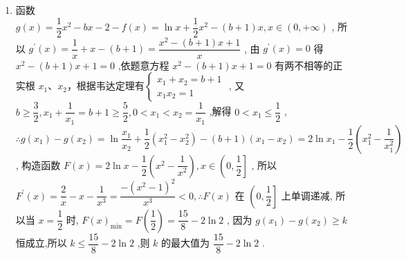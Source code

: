 \begin{enumerate}
\begin{enumerate}
\begin{jieda}
\begin{enumerate}
                $\therefore f\left( x\right)$ 在区间(0,1)上存在一个零点 ${x}_{3}$ ,此时 $k = 0$ ;
                又 $f\left( 3\right)  = 3 - \ln 3 - 2 = 1 - \ln 3 < 0$ , $f\left( 4\right)  = 4 - \ln 4 - 2 = 2 - 2\ln 2 = 2\left( {1 - \ln 2}\right)  > 0$ ,
                $\therefore f\left( x\right)$ 在区间(3,4)上存在一个零点 ${x}_{4}$ ,此时 $k = 3$ ,
                综上, $k$ 的值为 0 或 3 ;
                \item 函数 $g\left( x\right)  = \dfrac{1}{2}{x}^{2} - {bx} - 2 - f\left( x\right)  = \ln x + \dfrac{1}{2}{x}^{2} - \left( {b + 1}\right) x,x \in  \left( {0, + \infty }\right)$ ,
                所以 ${g}^{\prime }\left( x\right)  = \dfrac{1}{x} + x - \left( {b + 1}\right)  = \dfrac{{x}^{2} - \left( {b + 1}\right) x + 1}{x}$ ,
                由 ${g}^{\prime }\left( x\right)  = 0$ 得 ${x}^{2} - \left( {b + 1}\right) x + 1 = 0$ ,依题意方程 ${x}^{2} - \left( {b + 1}\right) x + 1 = 0$ 有两不相等的正实根 ${x}_{1}\text{、}{x}_{2}$，根据韦达定理有$\left\{\begin{array}{l}
                     {x}_{1} + {x}_{2} = b + 1  \\
                     {x}_{1}{x}_{2} = 1
                \end{array} \right.$ ,
                又 $b \geq  \dfrac{3}{2},{x}_{1} + \dfrac{1}{{x}_{1}} = b + 1 \geq  \dfrac{5}{2},0 < {x}_{1} < {x}_{2} = \dfrac{1}{{x}_{1}}$ ,解得 $0 < {x}_{1} \leq  \dfrac{1}{2}$ ,
                $\therefore g\left( {x}_{1}\right)  - g\left( {x}_{2}\right)  = \ln \dfrac{{x}_{1}}{{x}_{2}} + \dfrac{1}{2}\left( {{x}_{1}^{2} - {x}_{2}^{2}}\right)  - \left( {b + 1}\right) \left( {{x}_{1} - {x}_{2}}\right)  = 2\ln {x}_{1} - \dfrac{1}{2}\left( {{x}_{1}^{2} - \dfrac{1}{{x}_{1}^{2}}}\right)$ ,
                构造函数 $F\left( x\right)  = 2\ln x - \dfrac{1}{2}\left( {{x}^{2} - \dfrac{1}{{x}^{2}}}\right) ,x \in  \left( {0,\dfrac{1}{2}}\right\rbrack$ ,
                所以 ${F}^{\prime }\left( x\right)  = \dfrac{2}{x} - x - \dfrac{1}{{x}^{3}} = \dfrac{-{\left( {x}^{2} - 1\right) }^{2}}{{x}^{3}} < 0,\therefore F\left( x\right)$ 在 $\left( {0,\dfrac{1}{2}}\right\rbrack$ 上单调递减,
                所以当 $x = \dfrac{1}{2}$ 时, $F{\left( x\right) }_{\min } = F\left( \dfrac{1}{2}\right)  = \dfrac{15}{8} - 2\ln 2$ ,
                因为 $g\left( {x}_{1}\right)  - g\left( {x}_{2}\right)  \geq  k$ 恒成立,所以 $k \leq  \dfrac{15}{8} - 2\ln 2$ ,则 $k$ 的最大值为 $\dfrac{15}{8} - 2\ln 2$ .
            \end{enumerate}
        \end{jieda}
    \end{enumerate}


\end{enumerate}
